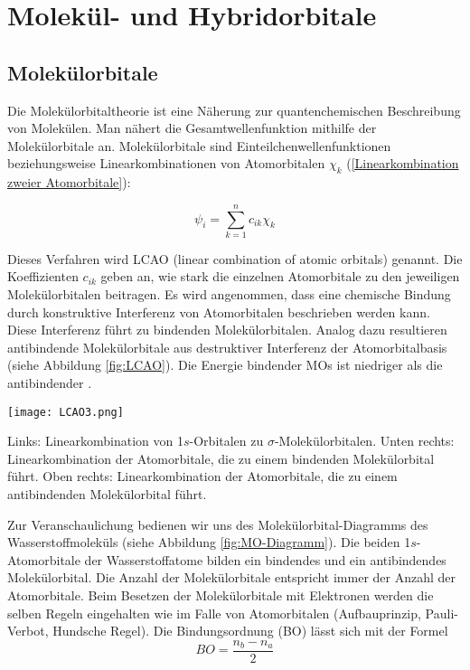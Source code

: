 \section{Molekül- und Hybridorbitale}
\subsection{Molekülorbitale}

Die Molekülorbitaltheorie ist eine Näherung zur quantenchemischen Beschreibung von Molekülen. Man nähert die Gesamtwellenfunktion mithilfe der Molekülorbitale an. Molekülorbitale sind Einteilchenwellenfunktionen beziehungsweise Linearkombinationen von Atomorbitalen $\chi_k$ (\ref{Linearkombination zweier Atomorbitale}):

\begin{equation}
 \label{Linearkombination zweier Atomorbitale}
 	\psi_i = \sum \limits_{k=1}^{n} c_{ik} \chi_k
\end{equation}

Dieses Verfahren wird LCAO (linear combination of atomic orbitals) genannt. Die Koeffizienten $c_{ik}$ geben an, wie stark die einzelnen Atomorbitale zu den jeweiligen Molekülorbitalen beitragen.
Es wird angenommen, dass eine chemische Bindung durch konstruktive Interferenz von Atomorbitalen beschrieben werden kann. Diese Interferenz führt zu bindenden Molekülorbitalen. Analog dazu resultieren antibindende Molekülorbitale aus destruktiver Interferenz der Atomorbitalbasis (siehe Abbildung \ref{fig:LCAO}). Die Energie bindender MOs ist niedriger als die antibindender \cite{Reinhold}.

\begin{dsafigure}
  \texttt{[image: LCAO3.png]}
  \caption{Links: Linearkombination von 1$s$-Orbitalen zu $\sigma$-Molekülorbitalen. Unten rechts: Linearkombination der Atomorbitale, die zu einem bindenden Molekülorbital führt. Oben rechts: Linearkombination der Atomorbitale, die zu einem antibindenden Molekülorbital führt. }
  \label{fig:LCAO}
\end{dsafigure}

Zur Veranschaulichung bedienen wir uns des Molekülorbital-Diagramms des Wasserstoffmoleküls (siehe Abbildung \ref{fig:MO-Diagramm}).
Die beiden 1$s$-Atomorbitale der Wasserstoffatome bilden ein bindendes und ein antibindendes Molekülorbital. Die Anzahl der Molekülorbitale entspricht immer der Anzahl der Atomorbitale. Beim Besetzen der Molekülorbitale mit Elektronen werden die selben Regeln eingehalten wie im Falle von Atomorbitalen (Aufbauprinzip, Pauli-Verbot, Hundsche Regel). Die Bindungsordnung (BO) lässt sich mit der Formel
\begin{equation}
 \label{Bindungsordnung}
 	BO = \frac{n_b-n_a}{2}
\end{equation}

